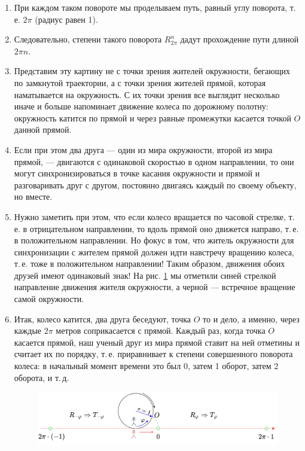 \begin{enumerate}
\item При каждом таком повороте мы проделываем путь, равный углу поворота, т.\,е. $2\pi$ (радиус равен 1).
\item Следовательно, степени такого поворота $R_{2\pi}^n$ дадут прохождение пути длиной $2\pi n$.
\item Представим эту картину не с точки зрения жителей окружности, бегающих по замкнутой траектории, а с точки зрения жителей прямой, которая наматывается на окружность. С их точки зрения все выглядит несколько иначе и больше напоминает движение колеса по дорожному полотну: окружность катится по прямой и через равные промежутки касается точкой $O$ данной прямой.
\item Если при этом два друга --- один из мира окружности, второй из мира прямой, --- двигаются с одинаковой скоростью в одном направлении, то они могут синхронизироваться в точке касания окружности и прямой и разговаривать друг с другом, постоянно двигаясь каждый по своему объекту, но вместе.
\item Нужно заметить при этом, что если колесо вращается по часовой стрелке, т.\,е. в отрицательном направлении, то вдоль прямой оно движется направо, т.\,е. в положительном направлении. Но фокус в том, что житель окружности для синхронизации с жителем прямой должен идти навстречу вращению колеса, т.\,е. тоже в положительном направлении! Таким образом, движения обоих друзей имеют одинаковый знак! На рис. \ref{RundLine} мы отметили синей стрелкой направление движения жителя окружности, а черной --- встречное вращение самой окружности.
\item Итак, колесо катится, два друга беседуют, точка $O$ то и дело, а именно, через каждые $2\pi$ метров соприкасается с прямой. Каждый раз, когда точка $O$ касается прямой, наш ученый друг из мира прямой ставит на ней отметины и считает их по порядку, т.\,е. приравнивает к степени совершенного поворота колеса: в начальный момент времени это был 0, затем 1 оборот, затем 2 оборота, и т.\,д.

\begin{figure}[hbt!]
\begin{center}
\includegraphics[scale=0.2]{RundLine.png}
\end{center}
\caption{}\label{RundLine}
\end{figure}


\end{enumerate}
